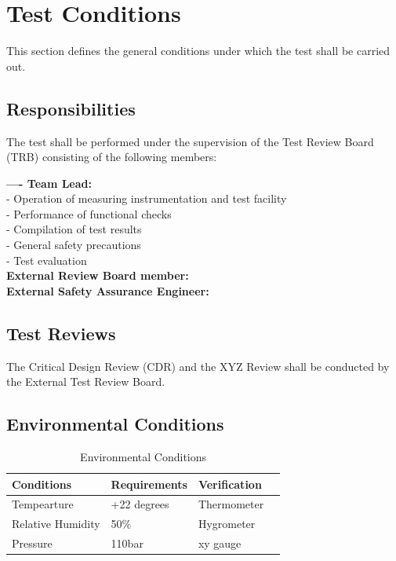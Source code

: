 \documentclass[12pt,a4paper,numbers=endperiod]{article}
\begin{document}
\section{Test Conditions}
This section defines the general conditions under which the test shall be carried out.
\subsection{Responsibilities}
The test shall be performed under the supervision of the Test Review Board (TRB) consisting of the following members:
\par \vspace{0.3cm}
{\bf---- Team Lead:}\\
- Operation of measuring instrumentation and test facility\\
- Performance of functional checks\\
- Compilation of test results\\
- General safety precautions\\
- Test evaluation\\

{\bf External Review Board member:}\\


{\bf External Safety Assurance Engineer:}\\ 

\subsection{Test Reviews}
The Critical Design Review (CDR) and the XYZ Review shall be conducted by the External Test Review Board. 
\subsection{Environmental Conditions}
\begin{table}[H]
	\centering
	\caption{Environmental Conditions}
\begin{tabular}{llll}
	\toprule
	Conditions & Requirements & Verification\\
	\midrule
	Tempearture & +22 degrees & Thermometer \\
	Relative Humidity & 50\% & Hygrometer\\
	Pressure & 110bar & xy gauge \\
	\bottomrule
\end{tabular}
\label{t:Env_Cond}
\end{table}
	
	 
\end{document}
